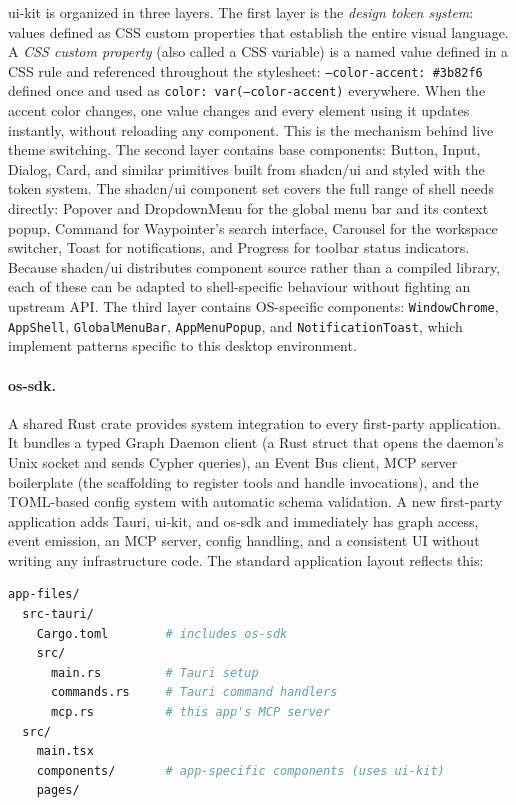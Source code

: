 ui-kit is organized in three layers. The first layer is the \emph{design token
system}: values defined as CSS custom properties that establish the entire
visual language. A \emph{CSS custom property} (also called a CSS variable) is
a named value defined in a CSS rule and referenced throughout the stylesheet:
\texttt{--color-accent: \#3b82f6} defined once and used as
\texttt{color: var(--color-accent)} everywhere. When the accent color changes,
one value changes and every element using it updates instantly, without
reloading any component. This is the mechanism behind live theme switching.
The second layer contains base components: Button, Input, Dialog, Card, and
similar primitives built from shadcn/ui and styled with the token system.
The shadcn/ui component set covers the full range of shell needs directly:
Popover and DropdownMenu for the global menu bar and its context popup,
Command for Waypointer's search interface, Carousel for the workspace
switcher, Toast for notifications, and Progress for toolbar status indicators.
Because shadcn/ui distributes component source rather than a compiled library,
each of these can be adapted to shell-specific behaviour without fighting an
upstream API.
The third layer contains OS-specific components: \texttt{WindowChrome},
\texttt{AppShell}, \texttt{GlobalMenuBar}, \texttt{AppMenuPopup}, and
\texttt{NotificationToast}, which implement patterns specific to this desktop
environment.

\paragraph{os-sdk.}
A shared Rust crate provides system integration to every first-party
application. It bundles a typed Graph Daemon client (a Rust struct that opens
the daemon's Unix socket and sends Cypher queries), an Event Bus client, MCP
server boilerplate (the scaffolding to register tools and handle invocations),
and the TOML-based config system with automatic schema validation. A new
first-party application adds Tauri, ui-kit, and os-sdk and immediately has
graph access, event emission, an MCP server, config handling, and a consistent
UI without writing any infrastructure code. The standard application layout
reflects this:

\begin{lstlisting}[language=bash, caption={Standard first-party app structure}]
app-files/
  src-tauri/
    Cargo.toml        # includes os-sdk
    src/
      main.rs         # Tauri setup
      commands.rs     # Tauri command handlers
      mcp.rs          # this app's MCP server
  src/
    main.tsx
    components/       # app-specific components (uses ui-kit)
    pages/
\end{lstlisting}

